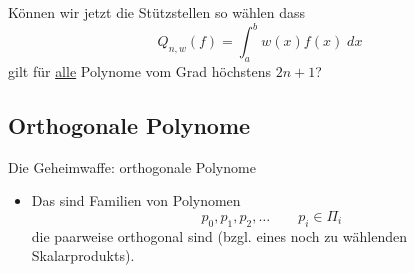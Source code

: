 Können wir jetzt die Stützstellen so wählen dass
\begin{equation*}
Q_{n,w}(f) = \int_a^b w(x) f(x) \; dx
\end{equation*}
gilt für \underline{alle} Polynome vom Grad höchstens $2n+1$?

\subsection{Orthogonale Polynome}

Die Geheimwaffe: orthogonale Polynome
\begin{itemize}
\item Das sind Familien von Polynomen
\begin{equation*}
p_0, p_1, p_2, \dots \hspace{2em} p_i \in \Pi_i
\end{equation*}
die paarweise orthogonal sind (bzgl. eines noch zu wählenden Skalarprodukts).
\end{itemize}

